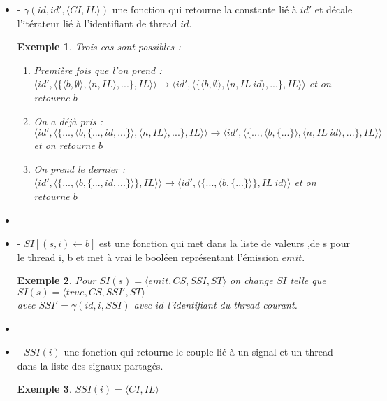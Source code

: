 \documentclass[10pt,a4paper]{report}
\newtheorem{ex}{Exemple}
\begin{document}
\begin{itemize}
		
		\item[] - $\gamma(id,id',\langle CI,IL\rangle)$ une fonction qui retourne la constante lié à $id'$ et décale l'itérateur lié à l'identifiant de thread $id$.
		\begin{ex}
			Trois cas sont possibles :
			\begin{enumerate}
				\item Première fois que l'on prend : $\langle id',\langle\{\langle b,\emptyset\rangle,\langle n,IL\rangle,...\},IL\rangle\rangle \rightarrow \langle id',\langle\{\langle b,\emptyset\rangle,\langle n,IL~id\rangle,...\},IL\rangle\rangle$ et on retourne $b$
				\item On a déjà pris : $\langle id',\langle\{...,\langle b,\{...,id,...\}\rangle,\langle n,IL\rangle,...\},IL\rangle\rangle \rightarrow \langle id',\langle\{...,\langle b,\{...\}\rangle,\langle n,IL~id\rangle,...\},IL\rangle\rangle$ et on retourne $b$
				\item On prend le dernier : $\langle id',\langle\{...,\langle b,\{...,id,...\}\rangle\},IL\rangle\rangle \rightarrow \langle id',\langle\{...,\langle b,\{...\}\rangle\},IL~id\rangle\rangle$ et on retourne $b$
			\end{enumerate}
		\end{ex}
		\item[] 
		
		\item[] - $SI[(s,i) \leftarrow b]$ est une fonction qui met dans la liste de valeurs ,de s pour le thread i, b et met à vrai le booléen représentant l'émission $emit$.
		\begin{ex}
			Pour $SI(s) = \langle emit,CS,SSI,ST\rangle$ on change $SI$ telle que $SI(s) = \langle true,CS,SSI',ST\rangle$\\ avec $SSI' = \gamma(id,i,SSI)$ avec $id$ l'identifiant du thread courant.
		\end{ex}
		\item[] 
		
		\item[] - $SSI(i)$ une fonction qui retourne le couple lié à un signal et un thread dans la liste des signaux partagés.
		\begin{ex}
			$SSI(i) = \langle CI,IL\rangle$
		\end{ex}
	\end{itemize}
	\bigbreak
	
\end{document}
